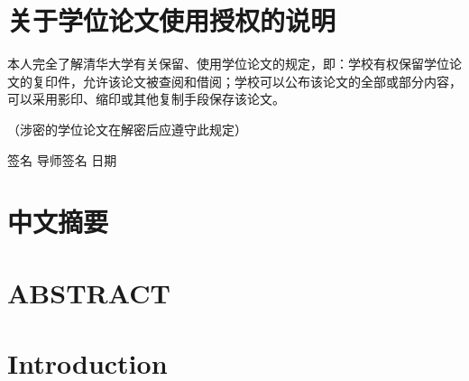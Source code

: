 \documentclass[twoside,12pt]{article}
\begin{document}
\pagestyle{empty}
\renewcommand{\thepage}{\alph{page}}



\cleardoublepage



\section*{关于学位论文使用授权的说明}

\hspace*{2em}%
本人完全了解清华大学有关保留、使用学位论文的规定，即：学校有权保留学位论文的复印件，允许该论文被查阅和借阅；学校可以公布该论文的全部或部分内容，可以采用影印、缩印或其他复制手段保存该论文。

\noindent\hspace*{2em}%
（涉密的学位论文在解密后应遵守此规定）

\bigskip
\hfill
签名 \underline{\hspace{6em}} \quad
导师签名 \underline{\hspace{6em}} \quad
日期 \underline{\hspace{6em}}

\cleardoublepage

\setcounter{page}{1}
\pagestyle{plain}
\renewcommand{\thepage}{\Roman{page}}

\section*{中文摘要}




\clearpage

\section*{ABSTRACT}




\clearpage



\def\contentsname{CONTENTS}
\tableofcontents

\clearpage

\setcounter{page}{1}
\renewcommand{\thepage}{\arabic{page}}

\section{Introduction} \label{intro}


\clearpage
\end{document}
